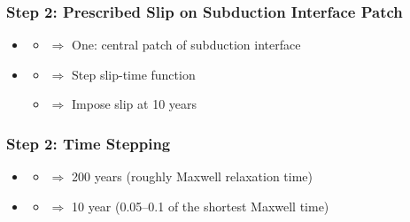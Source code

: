 \documentclass[aspectratio=169]{beamer}
\begin{document}
\begin{frame}
  \frametitle{Step 2: Prescribed Slip on Subduction Interface Patch}
  \summary{}

  \begin{itemize}
  \item {}\pause
    \begin{itemize}
    \item $\Rightarrow$ One: central patch of subduction interface\pause
    \end{itemize}
  \item {}\pause
    \begin{itemize}
    \item $\Rightarrow$ Step slip-time function
    \item $\Rightarrow$ Impose slip at 10 years
    \end{itemize}
  \end{itemize}
  
\end{frame}


\begin{frame}
  \frametitle{Step 2: Time Stepping}
  \summary{}

  \begin{itemize}
  \item {}\pause
    \begin{itemize}
    \item $\Rightarrow$ 200 years (roughly Maxwell relaxation time)\pause
    \end{itemize}
  \item {}\pause
    \begin{itemize}
    \item $\Rightarrow$ 10 year (0.05--0.1 of the shortest Maxwell time)
    \end{itemize}
  \end{itemize}
  
\end{frame}
\end{document}
